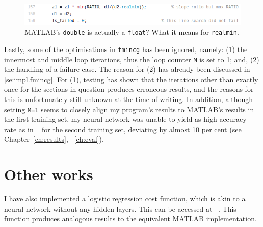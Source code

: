 \begin{figure}
	\centerline{\includegraphics[width=\linewidth]{realmin.png}}
	\caption{MATLAB's \texttt{double} is actually a \texttt{float}? What it means for \texttt{realmin}.}
	\label{fig:realmin}
\end{figure}

Lastly, some of the optimisations in \texttt{fmincg} has been ignored, namely: (1) the innermost and middle loop iterations, thus the loop counter \texttt{M} is set to 1; and, (2) the handling of a failure case. The reason for (2) has already been discussed in \ref{se:impl.fmincg}. For (1), testing has shown that the iterations other than exactly once for the sections in question produces erroneous results, and the reasons for this is unfortunately still unknown at the time of writing. In addition, although setting \texttt{M=1} seems to closely align my program's results to MATLAB's results in the first training set, my neural network was unable to yield as high accuracy rate as in ~\cite{LeC98} for the second training set, deviating by almost 10 per cent (see Chapter~\ref{ch:results}, ~\ref{ch:eval}).

\section{Other works}
I have also implemented a logistic regression cost function, which is akin to a neural network without any hidden layers. This can be accessed at ~\cite{McDJeo}. This function produces analogous results to the equivalent MATLAB implementation.